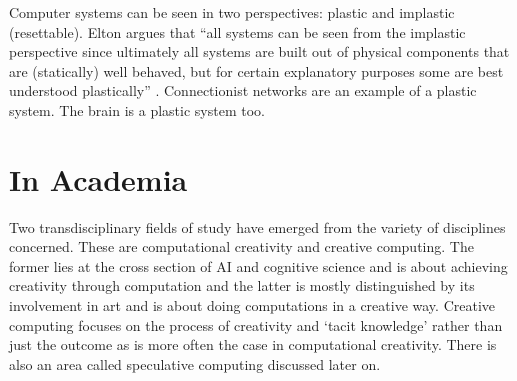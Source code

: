 Computer systems can be seen in two perspectives: plastic and implastic (resettable). Elton argues that ``all systems can be seen from the implastic perspective since ultimately all systems are built out of physical components that are (statically) well behaved, but for certain explanatory purposes some are best understood plastically'' \autocite*{Elton1995}. Connectionist networks are an example of a plastic system. The brain is a plastic system too.



\section{In Academia}

Two transdisciplinary fields of study have emerged from the variety of disciplines concerned. These are computational creativity and creative computing. The former lies at the cross section of \ac{AI} and cognitive science and is about achieving creativity through computation and the latter is mostly distinguished by its involvement in art and is about doing computations in a creative way. Creative computing focuses on the process of creativity and `tacit knowledge' rather than just the outcome as is more often the case in computational creativity. There is also an area called speculative computing discussed later on.

